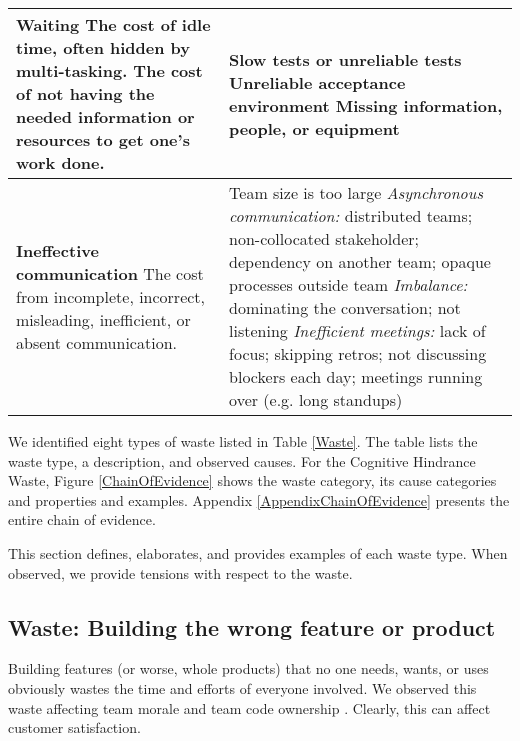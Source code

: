 \begin{table*}[htbp]
\begin{tabular}{|p{2.5in}|p{3.6in}|}
\textbf{Waiting} \newline The cost of idle time, often hidden by multi-tasking. The cost of not having the needed information or resources to get one's work done. & Slow tests or unreliable tests \newline Unreliable acceptance environment \newline Missing information, people, or equipment                                                                                                                                                                                                                                                                            \\ \hline
\textbf{Ineffective communication} \newline The cost from incomplete, incorrect, misleading, inefficient, or absent communication.                         & Team size is too large \newline \textit{Asynchronous communication:} distributed teams; non-collocated stakeholder; dependency on another team; opaque processes outside team \newline \textit{Imbalance:} dominating the conversation; not listening \newline \textit{Inefficient meetings:} lack of focus; skipping retros; not discussing blockers each day; meetings running over (e.g. long standups) \\ \hline                  
\end{tabular} 
\end{table*}

We identified eight types of waste listed in Table \ref{Waste}. The table lists the waste type, a description, and observed causes. For the Cognitive Hindrance Waste, Figure \ref{ChainOfEvidence} shows the waste category, its cause categories and properties and examples. Appendix \ref{AppendixChainOfEvidence} presents the entire chain of evidence.

This section defines, elaborates, and provides examples of each waste type. When observed, we provide tensions with respect to the waste.

\subsection{Waste: Building the wrong feature or product}
Building features (or worse, whole products) that no one needs, wants, or uses obviously wastes the time and efforts of everyone involved. We observed this waste affecting team morale and team code ownership \cite{SedanoTeamCodeOwnership}. Clearly, this can affect customer satisfaction. 


